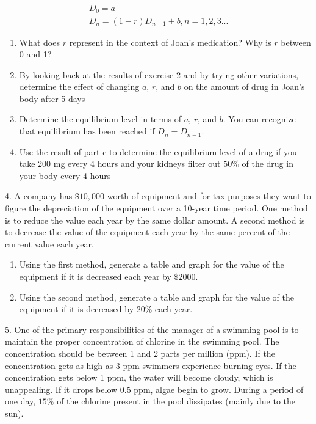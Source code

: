 \documentclass[10pt,]{book}
\theoremstyle{plain}
\theoremstyle{definition}
\theoremstyle{definition}
\numberwithin{equation}{section}
\begin{document}
\begin{exerciselist}
\begin{gather*}
D_0=a\\
D_n=(1-r) D_{n-1}+b, n=1,2,3...
\end{gather*}
\leavevmode%
\begin{enumerate}[label=(\alph*)]
\item\hypertarget{li-9}{}What does \(r\) represent in the context of Joan's medication?  Why is \(r\) between 0 and 1?%
\item\hypertarget{li-10}{}By looking back at the results of exercise 2 and by trying other variations, determine the effect of changing \(a\), \(r\), and \(b\) on the amount of drug in Joan's body after 5 days%
\item\hypertarget{li-11}{}Determine the equilibrium level in terms of \(a\), \(r\), and \(b\).  You can recognize that equilibrium has been reached if  \(D_n=D_{n-1}\).%
\item\hypertarget{li-12}{}Use the result of part c to determine the equilibrium level of a drug if you take 200 mg every 4 hours and your kidneys filter out \(50\%\) of the drug in your body every 4 hours%
\end{enumerate}
%
\par\smallskip
\item[4.]\hypertarget{exercise-4}{}A company has \(\$10,000\) worth of equipment and for tax purposes they want to figure the depreciation of the equipment over a 10-year time period.  One method is to reduce the value each year by the same dollar amount.  A second method is to decrease the value of the equipment each year by the same percent of the current value each year. \leavevmode%
\begin{enumerate}[label=(\alph*)]
\item\hypertarget{li-13}{}Using the first method, generate a table and graph for the value of the equipment if it is  decreased each year by \(\$2000\).%
\item\hypertarget{li-14}{}Using the second method, generate a table and graph for the value of the equipment if it is decreased by \(20\%\) each year.%
\end{enumerate}
%
\par\smallskip
\item[5.]\hypertarget{exercise-5}{}One of the primary responsibilities of the manager of a swimming pool is to maintain the proper concentration of chlorine in the swimming pool.  The concentration should be between 1 and 2 parts per million (ppm).  If the concentration gets as high as 3 ppm swimmers experience burning eyes.  If the concentration gets below 1 ppm, the water will become cloudy, which is unappealing.  If it drops below 0.5 ppm, algae begin to grow.  During a period of one day, \(15\%\) of the chlorine present in the pool dissipates (mainly due to the sun). \leavevmode%

\end{exerciselist}
\end{document}

